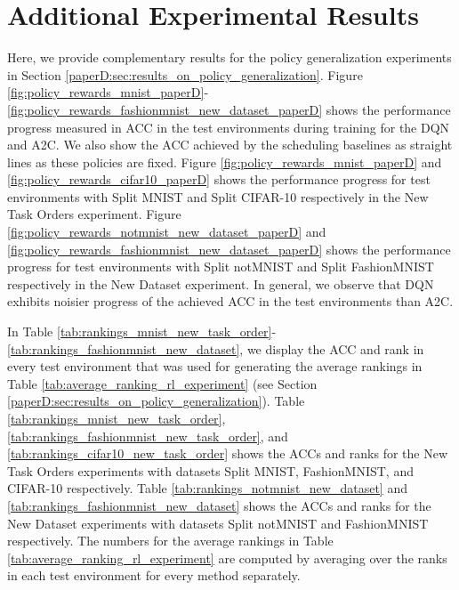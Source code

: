 
\section{Additional Experimental Results}\label{paperD:app:additional_experimental_results}


Here, we provide complementary results for the policy generalization experiments in Section \ref{paperD:sec:results_on_policy_generalization}. Figure \ref{fig:policy_rewards_mnist_paperD}-\ref{fig:policy_rewards_fashionmnist_new_dataset_paperD} shows the performance progress measured in ACC in the test environments during training for the DQN and A2C. We also show the ACC achieved by the scheduling baselines as straight lines as these policies are fixed. Figure \ref{fig:policy_rewards_mnist_paperD} and \ref{fig:policy_rewards_cifar10_paperD} shows the performance progress for test environments with Split MNIST and Split CIFAR-10 respectively in the New Task Orders experiment. Figure \ref{fig:policy_rewards_notmnist_new_dataset_paperD} and \ref{fig:policy_rewards_fashionmnist_new_dataset_paperD} shows the performance progress for test environments with Split notMNIST and Split FashionMNIST respectively in the New Dataset experiment. In general, we observe that DQN exhibits noisier progress of the achieved ACC in the test environments than A2C. 

In Table \ref{tab:rankings_mnist_new_task_order}-\ref{tab:rankings_fashionmnist_new_dataset}, we display the ACC and rank in every test environment that was used for generating the average rankings in Table \ref{tab:average_ranking_rl_experiment} (see Section \ref{paperD:sec:results_on_policy_generalization}). Table \ref{tab:rankings_mnist_new_task_order}, \ref{tab:rankings_fashionmnist_new_task_order}, and \ref{tab:rankings_cifar10_new_task_order} shows the ACCs and ranks for the New Task Orders experiments with datasets Split MNIST, FashionMNIST, and CIFAR-10 respectively. Table \ref{tab:rankings_notmnist_new_dataset} and \ref{tab:rankings_fashionmnist_new_dataset} shows the ACCs and ranks for the New Dataset experiments with datasets Split notMNIST and FashionMNIST respectively. The numbers for the average rankings in Table \ref{tab:average_ranking_rl_experiment} are computed by averaging over the ranks in each test environment for every method separately. 



